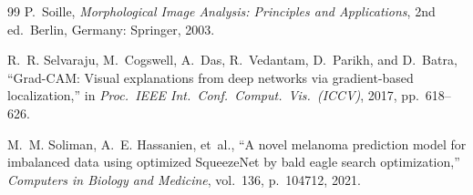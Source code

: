 \documentclass[conference]{IEEEtran}
\begin{document}
\begin{thebibliography}{99}
P.~Soille,
\emph{Morphological Image Analysis: Principles and Applications},
2nd ed.\ Berlin, Germany: Springer, 2003.

R.~R. Selvaraju, M.~Cogswell, A.~Das, R.~Vedantam, D.~Parikh, and D.~Batra,
``Grad-CAM: Visual explanations from deep networks via gradient-based localization,''
in \emph{Proc.\ IEEE Int.\ Conf.\ Comput.\ Vis.\ (ICCV)}, 2017, pp.~618--626.

M.~M. Soliman, A.~E. Hassanien, et~al.,
``A novel melanoma prediction model for imbalanced data using optimized SqueezeNet by bald eagle search optimization,''
\emph{Computers in Biology and Medicine}, vol.~136, p.~104712, 2021.

\end{thebibliography}
\end{document}
